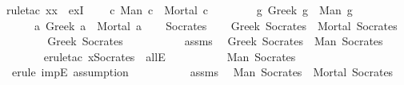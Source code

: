 \begin{isabellebody}
\begin{exercise}[subtitle=Isar dokazi u logici prvog reda.]
\ {\isacharparenleft}{\kern0pt}rule{\isacharunderscore}{\kern0pt}tac\ x{\isacharequal}{\kern0pt}{\isachardoublequoteopen}x{\isachardoublequoteclose}\ \ exI{\isacharparenright}{\kern0pt}\isanewline
{}\isamarkupfalse%
%
\endisatagproof
{\isafoldproof}%
%
\isadelimproof
\isanewline
%
\endisadelimproof
\isanewline
{}\isamarkupfalse%
\isanewline
\ \ \ {\isachardoublequoteopen}{\isasymforall}\ c{\isachardot}{\kern0pt}\ Man\ c\ {\isasymlongrightarrow}\ Mortal\ c{\isachardoublequoteclose}\isanewline
\ \ \ \ \ \ \ {\isachardoublequoteopen}{\isasymforall}\ g{\isachardot}{\kern0pt}\ Greek\ g\ {\isasymlongrightarrow}\ Man\ g{\isachardoublequoteclose}\isanewline
\ \ \ \ \ {\isachardoublequoteopen}{\isasymforall}\ a{\isachardot}{\kern0pt}\ Greek\ a\ {\isasymlongrightarrow}\ Mortal\ a{\isachardoublequoteclose}\isanewline
%
\isadelimproof
%
\endisadelimproof
%
\isatagproof
{}\isamarkupfalse%
\isanewline
\ \ \isamarkupfalse%
\ Socrates\isanewline
\ \ \isamarkupfalse%
\ {\isachardoublequoteopen}Greek\ Socrates\ {\isasymlongrightarrow}\ Mortal\ Socrates{\isachardoublequoteclose}\isanewline
\ \ \isamarkupfalse%
\isanewline
\ \ \ \ \isamarkupfalse%
\ {\isachardoublequoteopen}Greek\ Socrates{\isachardoublequoteclose}\isanewline
\ \ \ \ \isamarkupfalse%
\isanewline
\ \ \ \ \isamarkupfalse%
\ assms{\isacharparenleft}{\kern0pt}{}{\isacharparenright}{\kern0pt}\ \isamarkupfalse%
\ {\isachardoublequoteopen}Greek\ Socrates\ {\isasymlongrightarrow}\ Man\ Socrates{\isachardoublequoteclose}\ \isanewline
\ \ \ \ \ \ \isamarkupfalse%
\ {\isacharparenleft}{\kern0pt}erule{\isacharunderscore}{\kern0pt}tac\ x{\isacharequal}{\kern0pt}{\isachardoublequoteopen}Socrates{\isachardoublequoteclose}\ \ allE{\isacharparenright}{\kern0pt}\isanewline
\ \ \ \ \isamarkupfalse%
\isanewline
\ \ \ \ \isamarkupfalse%
\ {\isachardoublequoteopen}Man\ Socrates{\isachardoublequoteclose}\ \isamarkupfalse%
\ {\isacharminus}{\kern0pt}\ {\isacharparenleft}{\kern0pt}erule\ impE{\isacharcomma}{\kern0pt}\ assumption{\isacharparenright}{\kern0pt}\isanewline
\ \ \ \ \isamarkupfalse%
\isanewline
\ \ \ \ \isamarkupfalse%
\ assms{\isacharparenleft}{\kern0pt}{}{\isacharparenright}{\kern0pt}\ \isamarkupfalse%
\ {\isachardoublequoteopen}Man\ Socrates\ {\isasymlongrightarrow}\ Mortal\ Socrates{\isachardoublequoteclose}\ \isanewline

\end{exercise}
\end{isabellebody}
